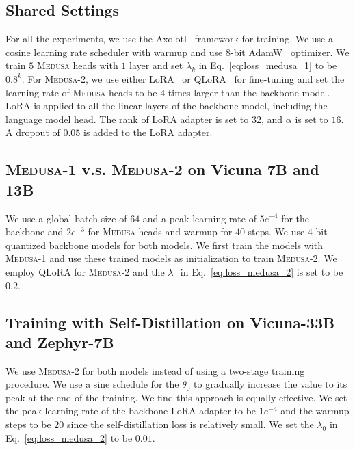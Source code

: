 \documentclass{article}
\theoremstyle{plain}
\theoremstyle{definition}
\theoremstyle{remark}
\newcommand{\ours}
{\textsc{Medusa}\xspace}
\begin{document}
\subsection{Shared Settings} 
For all the experiments, we use the Axolotl~\citep{axolotl2023} framework for training. We use a cosine learning rate scheduler with warmup and use 8-bit AdamW~\citep{dettmers20218bit} optimizer. We train $5$ \ours heads with $1$ layer and set $\lambda_k$ in Eq.~\eqref{eq:loss_medusa_1} to be $0.8^k$. For \ours-2, we use either LoRA~\citep{hu2021lora} or QLoRA~\citep{dettmers2023qlora} for fine-tuning and set the learning rate of \ours heads to be $4$ times larger than the backbone model. LoRA is applied to all the linear layers of the backbone model, including the language model head. The rank of LoRA adapter is set to $32$, and $\alpha$ is set to $16$. A dropout of $0.05$ is added to the LoRA adapter. 

\subsection{\ours-1 v.s. \ours-2 on Vicuna 7B and 13B} 
We use a global batch size of $64$ and a peak learning rate of $5e^{-4}$ for the backbone and $2e^{-3}$ for \ours heads and warmup for $40$ steps. We use $4$-bit quantized backbone models for both models. We first train the models with \ours-1 and use these trained models as initialization to train \ours-2. We employ QLoRA for \ours-2 and the  $\lambda_0$ in Eq.~\eqref{eq:loss_medusa_2} is set to be $0.2$.
\subsection{ Training with Self-Distillation on Vicuna-33B and Zephyr-7B} 
We use \ours-2 for both models instead of using a two-stage training procedure. We use a sine schedule for the $\theta_0$ to gradually increase the value to its peak at the end of the training. We find this approach is equally effective. We set the peak learning rate of the backbone LoRA adapter to be $1e^{-4}$ and the warmup steps to be $20$ since the self-distillation loss is relatively small. We set the $\lambda_0$ in Eq.~\eqref{eq:loss_medusa_2} to be $0.01$.
\end{document}
